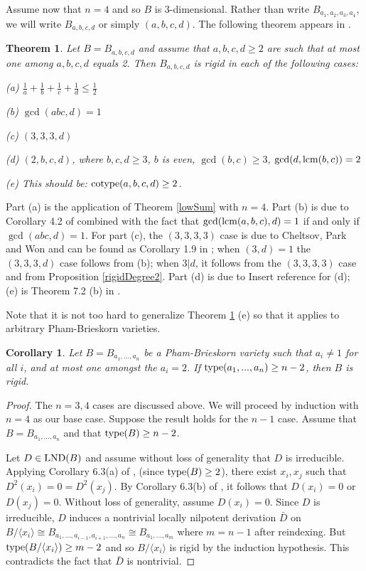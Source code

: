 \documentclass[12pt]{amsart}
\theoremstyle{plain}
\newcommand{\red}{\color{red}}
\newtheorem{theorem}[subsection]{Theorem}
\newtheorem{corollary}[subsection]{Corollary}
\theoremstyle{definition}
\newcommand{\lcm}{		\operatorname{{\rm lcm}}}
\newcommand{\type}{		\operatorname{{\rm type}}}
\newcommand{\cotype}{		\operatorname{{\rm cotype}}}
\newcommand{\lb}{\langle}
\newcommand{\rb}{\rangle}
\newcommand{\lnd}{\operatorname{{\rm LND}}}
\newcommand{\isom}{\cong}
\begin{document}
Assume now that $n=4$ and so $B$ is 3-dimensional. Rather than write $B_{a_1,a_2,a_3,a_4}$, we will write $B_{a,b,c,d}$ or simply $(a,b,c,d)$. The following theorem appears in \cite{LNDsAbelianGroup}.    

\begin{theorem} \label{collection}
	Let $B = B_{a,b,c,d}$ and assume that $a,b,c,d \geq 2$ are such that at most one among $a,b,c,d$ equals 2. Then $B_{a,b,c,d}$ is rigid in each of the following cases:
	
	(a)  $\frac{1}{a} + \frac{1}{b} + \frac{1}{c} + \frac{1}{d} \leq \frac{1}{2}$
	
	(b) $\gcd(abc,d) = 1$
	
	(c) $(3,3,3,d)$
	
	(d) $(2,b,c,d)$, where $b,c,d \geq 3$, $b$ is even, $\gcd(b,c) \geq 3$, $\gcd(d,\lcm(b,c)) = 2$
	
	(e) \xout{$\type(a,b,c,d) \geq 2$} {\rm\red This should be: $\cotype(a,b,c,d) \ge 2$.}
\end{theorem}

Part (a) is the application of Theorem \ref{lowSum} with $n=4$. Part (b) is due to Corollary 4.2 of \cite{freudenburg2013} combined with the fact that $\gcd(\lcm(a,b,c),d) = 1$ if and only if $\gcd(abc,d) = 1$. For part (c), the $(3,3,3,3)$ case is due to Cheltsov, Park and Won and can be found as Corollary 1.9 in \cite{affineCones}; when $(3,d) = 1$ the $(3,3,3,d)$ case follows from (b); when $3|d$, it follows from the $(3,3,3,3)$ case and from Proposition \ref{rigidDegree2}. Part (d) is due to {\red Insert reference for (d)}; (e) is Theorem 7.2 (b) in \cite{LNDsAbelianGroup}.

Note that it is not too hard to generalize Theorem \ref{collection} (e) so that it applies to arbitrary Pham-Brieskorn varieties. 

\begin{corollary}
	Let $B = B_{a_1,...,a_n}$ be a Pham-Brieskorn variety such that $a_i \neq 1$ for all $i$, and at most one amongst the $a_i = 2$. If $\type(a_1,...,a_n) \geq n-2$, then $B$ is rigid.  
\end{corollary}

\begin{proof}
	The $n = 3,4$ cases are discussed above. We will proceed by induction with $n=4$ as our base case. Suppose the result holds for the $n-1$ case. Assume that $B = B_{a_1, ..., a_n}$ and that $\type(B) \geq n-2$. 
	
	Let $D \in \lnd(B)$ and assume without loss of generality that $D$ is irreducible. Applying Corollary 6.3(a) of \cite{LNDsAbelianGroup}, (since $\type(B) \geq 2$), there exist $x_i,x_j$ such that $D^2(x_i) = 0 = D^2(x_j)$. By Corollary 6.3(b) of \cite{LNDsAbelianGroup}, it follows that $D(x_i) = 0$ or $D(x_j) = 0$. Without loss of generality, assume $D(x_i) = 0$. Since $D$ is irreducible, $D$ induces a nontrivial locally nilpotent derivation $\bar{D}$ on $B / \lb x_i \rb \isom B_{a_1,...,a_{i-1},a_{i+1},...,a_n} \isom B_{a_1,...,a_m}$ where $m = n-1$ after reindexing. But $\type(B / \lb x_i \rb) \geq m-2$ and so $B / \lb x_i \rb$ is rigid by the induction hypothesis. This contradicts the fact that $\bar{D}$ is nontrivial.        
\end{proof}
\end{document}
